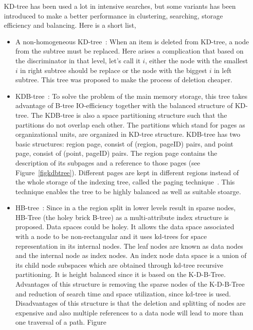 \documentclass[a4paper,12pt]{article}
\begin{document}
KD-tree has been used a lot in intensive searches, but some variants has been introduced to make a better performance in clustering, searching, storage efficiency and balancing. Here is a short list,
\begin{itemize}
\item A non-homogeneous KD-tree~\cite{nonhomkdtree}: When an item is deleted from KD-tree, a node from the subtree must be replaced. Here arises a complication that based on the discriminator in that level, let's call it $i$, either the node with the smallest $i$ in right subtree should be replace or the node with the biggest $i$ in left subtree.  This tree was proposed to make the process of deletion cheaper.
\item KDB-tree~\cite{kdbtree}: To solve the problem of the main memory storage, this tree takes advantage of B-tree IO-efficiency together with the balanced structure of KD-tree. The KDB-tree is also a space partitioning structure such that the partitions do not overlap each other. 
The partitions which stand for pages as organizational units, are organized in KD-tree structure. 
KDB-tree has two basic structures: region page, consist of (region, pageID) pairs, and point page, consist of  (point, pageID) pairs. The region page contains the description of its subpages and a reference to those pages (see Figure~\ref{figkdbtree}). 
Different pages are kept in different regions instead of the whole storage of the indexing tree, called the paging technique~\cite{bintreepaging}.
This technique enables the tree to be highly balanced as well as suitable stoarge.
\item HB-tree~\cite{hbtree1}: Since in a the region split in lower levels result in sparse nodes, HB-Tree (the holey brick B-tree) as a multi-attribute index structure is proposed. Data spaces could be holey. It allows the data space associated with a node to be non-rectangular and it uses kd-trees for space representation in its internal nodes. The leaf nodes are known as data nodes and the internal node as index nodes. An index node data space is a union of its child node subspaces which are obtained through kd-tree recursive partitioning. It is height balanced since it is based on the K-D-B-Tree. 
Advantages of this structure is removing the sparse nodes of the K-D-B-Tree and reduction of search time and space utilization, since kd-tree is used. 
Disadvantages of this structure is that the deletion and splitting of nodes are expensive and also multiple references to a data node will lead to more than one traversal of a path. Figure

\end{itemize}
\end{document}
